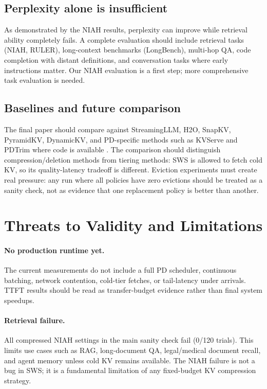 \documentclass[11pt]{article}
\newcommand{\method}{SWS}
\newcommand{\sws}{SWS}
\theoremstyle{definition}
\theoremstyle{plain}
\begin{document}
\subsection{Perplexity alone is insufficient}
As demonstrated by the NIAH results, perplexity can improve while retrieval ability completely fails.  A complete evaluation should include retrieval tasks (NIAH, RULER), long-context benchmarks (LongBench), multi-hop QA, code completion with distant definitions, and conversation tasks where early instructions matter.  Our NIAH evaluation is a first step; more comprehensive task evaluation is needed.

\subsection{Baselines and future comparison}
The final paper should compare against StreamingLLM, H2O, SnapKV, PyramidKV, DynamicKV, and PD-specific methods such as KVServe and PDTrim where code is available \citep{xiao2023streamingllm,zhang2023h2o,li2024snapkv,cai2024pyramidkv,zhou2024dynamickv,liu2026kvserve,pdtrim2025}.  The comparison should distinguish compression/deletion methods from tiering methods: \method{} is allowed to fetch cold KV, so its quality-latency tradeoff is different.  Eviction experiments must create real pressure: any run where all policies have zero evictions should be treated as a sanity check, not as evidence that one replacement policy is better than another.

\section{Threats to Validity and Limitations}
\label{sec:limitations}

\paragraph{No production runtime yet.}
The current measurements do not include a full PD scheduler, continuous batching, network contention, cold-tier fetches, or tail-latency under arrivals.  TTFT results should be read as transfer-budget evidence rather than final system speedups.

\paragraph{Retrieval failure.}
All compressed NIAH settings in the main sanity check fail (0/120 trials).  This limits use cases such as RAG, long-document QA, legal/medical document recall, and agent memory unless cold KV remains available.  The NIAH failure is not a bug in \sws{}; it is a fundamental limitation of any fixed-budget KV compression strategy.
\end{document}
